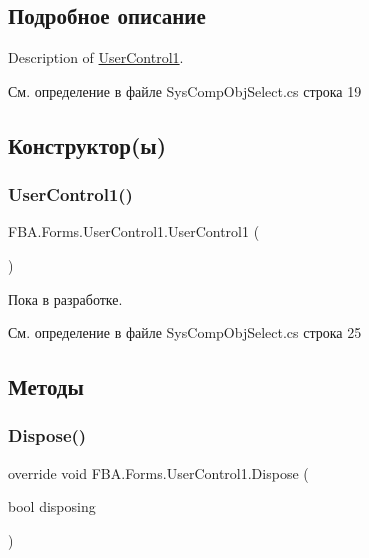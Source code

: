 \subsection{Подробное описание}
Description of \mbox{\hyperlink{class_f_b_a_1_1_forms_1_1_user_control1}{User\+Control1}}. 



См. определение в файле Sys\+Comp\+Obj\+Select.\+cs строка 19



\subsection{Конструктор(ы)}
\mbox{\label{class_f_b_a_1_1_forms_1_1_user_control1_a226de5d82a2ac1946e939b821b829b0b}} 
\subsubsection{\texorpdfstring{User\+Control1()}{UserControl1()}}
{\footnotesize\ttfamily F\+B\+A.\+Forms.\+User\+Control1.\+User\+Control1 (\begin{DoxyParamCaption}{ }\end{DoxyParamCaption})}



Пока в разработке. 



См. определение в файле Sys\+Comp\+Obj\+Select.\+cs строка 25



\subsection{Методы}
\mbox{\label{class_f_b_a_1_1_forms_1_1_user_control1_a82464b78281ed2ffd68292863830b3b2}} 
\subsubsection{\texorpdfstring{Dispose()}{Dispose()}}
{\footnotesize\ttfamily override void F\+B\+A.\+Forms.\+User\+Control1.\+Dispose (\begin{DoxyParamCaption}\item[{bool}]{disposing }\end{DoxyParamCaption})\hspace{0.3cm}{\ttfamily [protected]}}



